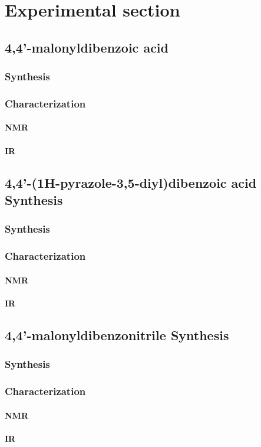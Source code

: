\documentclass[../Master.tex]{subfiles}
\begin{document}
\chapter{Experimental section}
\section{4,4'-malonyldibenzoic acid }
\subsection{Synthesis}
\subsection{Characterization}
\subsubsection{NMR}
\subsubsection{IR}
\section{4,4'-(1H-pyrazole-3,5-diyl)dibenzoic acid Synthesis}
\subsection{Synthesis}
\subsection{Characterization}
\subsubsection{NMR}
\subsubsection{IR}
\section{4,4'-malonyldibenzonitrile Synthesis}
\subsection{Synthesis}
\subsection{Characterization}
\subsubsection{NMR}
\subsubsection{IR}
\end{document}

